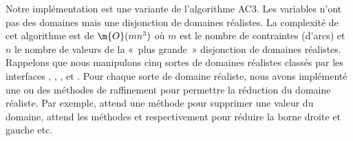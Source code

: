 Notre implémentation est une variante de l'algorithme AC3. Les variables n'ont
pas des domaines mais une disjonction de domaines réalistes. La complexité de
cet algorithme est de $\m{O}(mn^3)$ où $m$ est le nombre de contraintes (d'arcs)
et $n$ le nombre de valeurs de la «~plus grande~» disjonction de domaines
réalistes. Rappelons que nous manipulons cinq sortes de domaines réalistes
classés par les interfaces , , ,
 et . Pour chaque sorte de domaine réaliste, nous
avons implémenté une ou des méthodes de raffinement pour permettre la réduction
du domaine réaliste. Par exemple,  attend une méthode
 pour supprimer une valeur du domaine,  attend
les méthodes  et  respectivement pour
réduire la borne droite et gauche etc.

